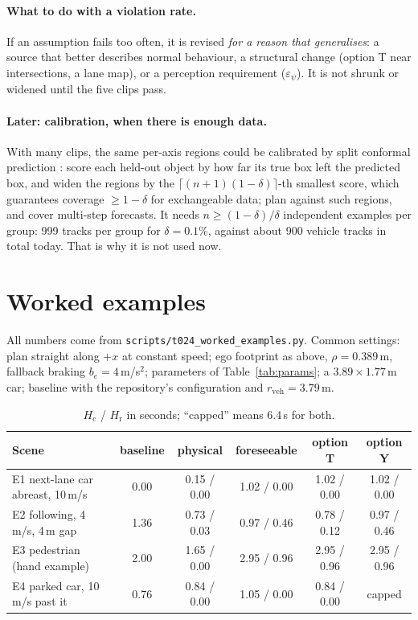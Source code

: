 \documentclass[11pt]{article}
\theoremstyle{definition}
\theoremstyle{remark}
\newcommand{\Hc}{H_{\mathrm{c}}}
\newcommand{\Hr}{H_{\mathrm{r}}}
\begin{document}
\paragraph{What to do with a violation rate.} If an assumption fails too often, it is revised \emph{for a
reason that generalises}: a source that better describes normal behaviour, a structural change (option T
near intersections, a lane map), or a perception requirement ($\varepsilon_\psi$). It is not shrunk or
widened until the five clips pass.

\paragraph{Later: calibration, when there is enough data.} With many clips, the same per-axis regions
could be calibrated by split conformal prediction \cite{vovk2005,angelopoulos2023}: score each held-out
object by how far its true box left the predicted box, and widen the regions by the
$\lceil(n+1)(1-\delta)\rceil$-th smallest score, which guarantees coverage $\ge1-\delta$ for exchangeable
data; \cite{lindemann2023} plan against such regions, and \cite{stankeviciute2021} cover multi-step
forecasts. It needs $n\ge(1-\delta)/\delta$ independent examples per group: 999 tracks per group for
$\delta=0.1\%$, against about 900 vehicle tracks in total today. That is why it is not used now.

\section{Worked examples}\label{sec:examples}
All numbers come from \texttt{scripts/t024\_worked\_examples.py}. Common settings: plan straight along
$+x$ at constant speed; ego footprint as above, $\rho=0.389$\,m, fallback braking $b_e=4$\,m/s$^2$;
parameters of Table~\ref{tab:params}; a $3.89\times1.77$\,m car; baseline with the repository's
configuration and $r_{\mathrm{veh}}=3.79$\,m.

\begin{table}[h]
\centering
\begin{tabular}{p{5.6cm}ccccc}
\toprule
Scene & baseline & physical & foreseeable & option T & option Y \\
\midrule
E1 next-lane car abreast, 10\,m/s & 0.00 & 0.15 / 0.00 & 1.02 / 0.00 & 1.02 / 0.00 & 1.02 / 0.00 \\
E2 following, 4\,m/s, 4\,m gap & 1.36 & 0.73 / 0.03 & 0.97 / 0.46 & 0.78 / 0.12 & 0.97 / 0.46 \\
E3 pedestrian (hand example) & 2.00 & 1.65 / 0.00 & 2.95 / 0.96 & 2.95 / 0.96 & 2.95 / 0.96 \\
E4 parked car, 10\,m/s past it & 0.76 & 0.84 / 0.00 & 1.05 / 0.00 & 0.84 / 0.00 & capped \\
\bottomrule
\end{tabular}
\caption{$\Hc$ / $\Hr$ in seconds; ``capped'' means 6.4\,s for both.}
\label{tab:examples}
\end{table}
\end{document}
